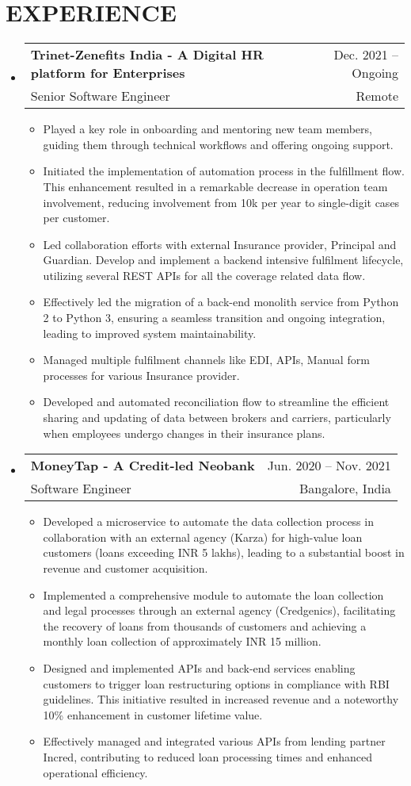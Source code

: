 \documentclass[letterpaper,11pt]{article}
\makeatletter
\newcommand{\resumeSubHeadingListStart}{\begin{itemize}[leftmargin=0in, label={}]}
\newcommand{\resumeSubHeadingListEnd}{\end{itemize}}
\newcommand{\resumeItemListStart}{\begin{itemize}}
\newcommand{\resumeItemListEnd}{\end{itemize}\vspace{-5pt}}
\newcommand{\resumeItem}[1]{
    \item\small{
            {#1 \vspace{-1pt}}
    }
}
\newcommand{\resumeSubheading}[4]{
    \vspace{-1pt}\item
    \begin{tabular*}{\textwidth}[t]{l@{\extracolsep{\fill}}r}
    \textbf{#1} & {\color{dark-grey}\small #2}\vspace{1pt}\\ %
    {#3} & {\color{dark-grey} \small #4}\\ %
    \end{tabular*}\vspace{-7pt}
}
\makeatother
\begin{document}
\section{EXPERIENCE}
\resumeSubHeadingListStart
\resumeSubheading
{Trinet-Zenefits India - A Digital HR platform for Enterprises}{Dec. 2021 -- Ongoing}
{Senior Software Engineer}{Remote}
\resumeItemListStart
\resumeItem{Played a key role in onboarding and mentoring new team members, guiding them through technical workflows and offering ongoing support.}
\resumeItem{Initiated the implementation of automation process in the fulfillment flow. This enhancement resulted in a remarkable decrease in operation team involvement, reducing involvement from 10k per year to single-digit cases per customer.}
\resumeItem{Led collaboration efforts with external Insurance provider, Principal and Guardian. Develop and implement a backend intensive fulfilment lifecycle, utilizing several REST APIs for all the coverage related data flow.}
\resumeItem{Effectively led the migration of a back-end monolith service from Python 2 to Python 3, ensuring a seamless transition and ongoing integration, leading to improved system maintainability.}
\resumeItem{Managed multiple fulfilment channels like EDI, APIs, Manual form processes for various Insurance provider.}
\resumeItem{Developed and automated reconciliation flow to streamline the efficient sharing and updating of data between brokers and carriers, particularly when employees undergo changes in their insurance plans.}
\resumeItemListEnd
\resumeSubheading
{MoneyTap - A Credit-led Neobank}{Jun. 2020 -- Nov. 2021}
{Software Engineer}{Bangalore, India}
\resumeItemListStart
\resumeItem{Developed a microservice to automate the data collection process in collaboration with an external agency (Karza) for high-value loan customers (loans exceeding INR 5 lakhs), leading to a substantial boost in revenue and customer acquisition.}
\resumeItem{Implemented a comprehensive module to automate the loan collection and legal processes through an external agency (Credgenics), facilitating the recovery of loans from thousands of customers and achieving a monthly loan collection of approximately INR 15 million.}
\resumeItem{Designed and implemented APIs and back-end services enabling customers to trigger loan restructuring options in compliance with RBI guidelines. This initiative resulted in increased revenue and a noteworthy 10\% enhancement in customer lifetime value.}
\resumeItem{Effectively managed and integrated various APIs from lending partner Incred, contributing to reduced loan processing times and enhanced operational efficiency.}
\resumeItemListEnd
\resumeSubHeadingListEnd
\end{document}
